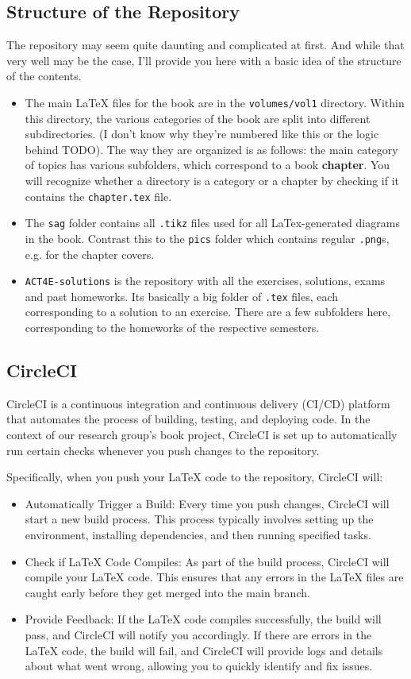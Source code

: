 \documentclass{article}
\begin{document}
\subsection{Structure of the Repository}
The repository may seem quite daunting and complicated at first. And while that very well may be the case, I'll provide you here with a basic idea of the structure of the contents.
\begin{itemize}
\item The main LaTeX files for the book are in the \texttt{volumes/vol1} directory. Within this directory, the various categories of the book are split into different subdirectories. (I don't know why they're numbered like this or the logic behind TODO). The way they are organized is as follows: the main category of topics has various subfolders, which correspond to a book \textbf{chapter}. You will recognize whether a directory is a category or a chapter by checking if it contains the \texttt{chapter.tex} file.
\item The \texttt{sag} folder contains all \texttt{.tikz} files used for all LaTex-generated diagrams in the book. Contrast this to the \texttt{pics} folder which contains regular \texttt{.png}s, e.g. for the chapter covers.
\item \texttt{ACT4E-solutions} is the repository with all the exercises, solutions, exams and past homeworks. Its basically a big folder of \texttt{.tex} files, each corresponding to a solution to an exercise. There are a few subfolders here, corresponding to the homeworks of the respective semesters.
\end{itemize}

\subsection{CircleCI}
CircleCI is a continuous integration and continuous delivery (CI/CD) platform that automates the process of building, testing, and deploying code. In the context of our research group's book project, CircleCI is set up to automatically run certain checks whenever you push changes to the repository.

Specifically, when you push your LaTeX code to the repository, CircleCI will:
\begin{itemize}
\item Automatically Trigger a Build: Every time you push changes, CircleCI will start a new build process. This process typically involves setting up the environment, installing dependencies, and then running specified tasks.

\item Check if LaTeX Code Compiles: As part of the build process, CircleCI will compile your LaTeX code. This ensures that any errors in the LaTeX files are caught early before they get merged into the main branch.

\item Provide Feedback: If the LaTeX code compiles successfully, the build will pass, and CircleCI will notify you accordingly. If there are errors in the LaTeX code, the build will fail, and CircleCI will provide logs and details about what went wrong, allowing you to quickly identify and fix issues.
\end{itemize}
\end{document}
